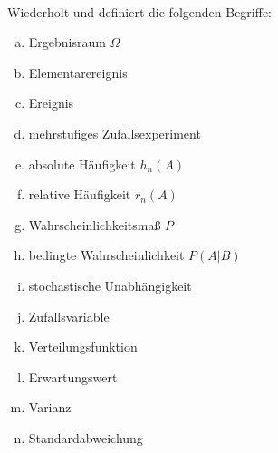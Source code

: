 \newcommand{\printpraesenzlsg}{false}
\newcommand{\printloesungen}{false}
\newcommand{\printbewertungen}{false}
\newcommand{\blattnummer}{1}



\iforiginal{}

	


\\
Wiederholt und definiert die folgenden Begriffe:
\begin{enumerate}[a)]
  \item Ergebnisraum $\Omega$
  \item Elementarereignis 
  \item Ereignis
  \item mehrstufiges Zufallsexperiment 
  \item absolute Häufigkeit $h_n(A)$
  \item relative Häufigkeit $r_n(A)$
  \item Wahrscheinlichkeitsmaß $P$
  \item bedingte Wahrscheinlichkeit $P(A|B)$
  \item stochastische Unabhängigkeit 
  \item Zufallsvariable 
  \item Verteilungsfunktion 
  \item Erwartungswert 
  \item Varianz 
  \item Standardabweichung 
\end{enumerate}

\\

